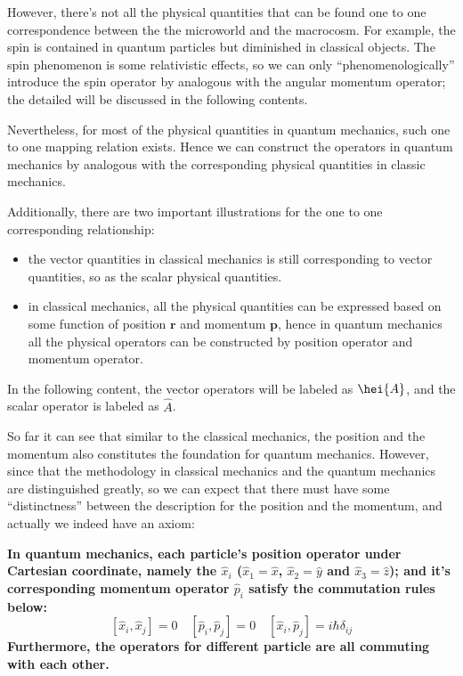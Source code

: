 However, there's not all the physical quantities that can be found
one to one correspondence between the the microworld and the
macrocosm. For example, the spin is contained in quantum particles
but diminished in classical objects. The spin phenomenon is some
relativistic effects, so we can only ``phenomenologically''
introduce the spin operator by analogous with the angular momentum
operator; the detailed will be discussed in the following contents.

Nevertheless, for most of the physical quantities in quantum
mechanics, such one to one mapping relation exists. Hence we can
construct the operators in quantum mechanics by analogous with the
corresponding physical quantities in classic mechanics.

Additionally, there are two important illustrations for the one to
one corresponding relationship:
\begin{itemize}
  \item  the vector quantities in classical mechanics is still
  corresponding to vector quantities, so as the scalar physical
  quantities.
  \item  in classical mechanics, all the physical quantities can be
  expressed based on some function of
  position $\bm{r}$ and momentum $\bm{p}$, hence in quantum
  mechanics all the physical operators can be constructed
  by position operator and momentum operator.
\end{itemize}
In the following content, the vector operators will be labeled as
$\hei{A}$, and the scalar operator is labeled as $\hat{A}$.

So far it can see that similar to the classical mechanics, the
position and the momentum also constitutes the foundation for
quantum mechanics. However, since that the methodology in classical
mechanics and the quantum mechanics are distinguished greatly, so we
can expect that there must have some ``distinctness'' between the
description for the position and the momentum, and actually we
indeed have an axiom:
\begin{axiom}\label{axiom5}
\textbf{In quantum mechanics, each particle's position operator
under Cartesian coordinate, namely the $\hat{x}_{i}$ ($\hat{x}_{1} =
\hat{x}$, $\hat{x}_{2} = \hat{y}$ and $\hat{x}_{3} = \hat{z}$); and
it's corresponding momentum operator $\hat{p}_{i}$ satisfy the
commutation rules below:
\begin{equation}\label{PRAMReq:37}
[\hat{x}_{i}, \hat{x}_{j}] = 0 \quad [\hat{p}_{i}, \hat{p}_{j}] = 0
\quad [\hat{x}_{i}, \hat{p}_{j}] = i\hbar\delta_{ij}
\end{equation}
Furthermore, the operators for different particle are all commuting
with each other.}
\end{axiom}

